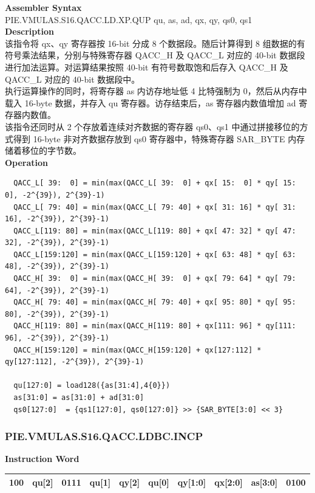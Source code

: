 \textbf{Assembler Syntax} \\
PIE.VMULAS.S16.QACC.LD.XP.QUP qu, as, ad, qx, qy, qs0, qs1 \\
\textbf{Description} \\
该指令将 qx、qy 寄存器按 16-bit 分成 8 个数据段。随后计算得到 8 组数据的有符号乘法结果，分别与特殊寄存器 QACC\_H 及 QACC\_L 对应的 40-bit 数据段进行加法运算。对运算结果按照 40-bit 有符号数取饱和后存入 QACC\_H 及 QACC\_L 对应的 40-bit 数据段中。\\
执行运算操作的同时，将寄存器 as 内访存地址低 4 比特强制为 0，然后从内存中载入 16-byte 数据，并存入 qu 寄存器。访存结束后，as 寄存器内数值增加 ad 寄存器内数值。\\
该指令还同时从 2 个存放着连续对齐数据的寄存器 qs0、qs1 中通过拼接移位的方式得到 16-byte 非对齐数据存放到 qs0 寄存器中，特殊寄存器 SAR\_BYTE 内存储着移位的字节数。\\
\textbf{Operation}
\begin{lstlisting}
  QACC_L[ 39:  0] = min(max(QACC_L[ 39:  0] + qx[ 15:  0] * qy[ 15:  0], -2^{39}), 2^{39}-1)
  QACC_L[ 79: 40] = min(max(QACC_L[ 79: 40] + qx[ 31: 16] * qy[ 31: 16], -2^{39}), 2^{39}-1)
  QACC_L[119: 80] = min(max(QACC_L[119: 80] + qx[ 47: 32] * qy[ 47: 32], -2^{39}), 2^{39}-1)
  QACC_L[159:120] = min(max(QACC_L[159:120] + qx[ 63: 48] * qy[ 63: 48], -2^{39}), 2^{39}-1)
  QACC_H[ 39:  0] = min(max(QACC_H[ 39:  0] + qx[ 79: 64] * qy[ 79: 64], -2^{39}), 2^{39}-1)
  QACC_H[ 79: 40] = min(max(QACC_H[ 79: 40] + qx[ 95: 80] * qy[ 95: 80], -2^{39}), 2^{39}-1)
  QACC_H[119: 80] = min(max(QACC_H[119: 80] + qx[111: 96] * qy[111: 96], -2^{39}), 2^{39}-1)
  QACC_H[159:120] = min(max(QACC_H[159:120] + qx[127:112] * qy[127:112], -2^{39}), 2^{39}-1)

  qu[127:0] = load128({as[31:4],4{0}})
  as[31:0] = as[31:0] + ad[31:0]
  qs0[127:0]  = {qs1[127:0], qs0[127:0]} >> {SAR_BYTE[3:0] << 3}
\end{lstlisting}

\newpage
\subsubsection{PIE.VMULAS.S16.QACC.LDBC.INCP}\label{instruction:PIEVMULASS16QACCLDBCINCP}
\setlength\tabcolsep{6pt}
\textbf{Instruction Word} \\
\begin{tabular}{|c|c|c|c|c|c|c|c|c|c|}
	\hline
	100 & qu[2] & 0111 & qu[1] & qy[2] & qu[0] & qy[1:0] & qx[2:0] & as[3:0] & 0100 \\
	\hline
\end{tabular}

